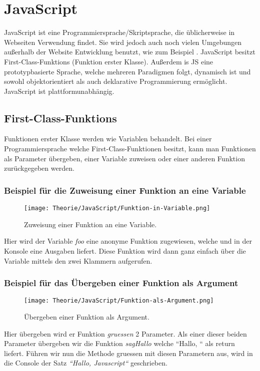 \section{JavaScript}
\label{js}

JavaScript ist eine Programmiersprache/Skriptsprache, die üblicherweise in Webseiten Verwendung findet. Sie wird jedoch auch noch vielen Umgebungen außerhalb der Website Entwicklung benutzt, 
wie zum Beispiel .
JavaScript besitzt First-Class-Funktions (Funktion erster Klasse). Außerdem is JS eine prototypbasierte Sprache, welche mehreren Paradigmen folgt, dynamisch ist und sowohl 
objektorientiert als auch deklarative Programmierung ermöglicht. JavaScript ist plattformunabhängig.~\cite{JS}

\subsection{First-Class-Funktions}
Funktionen erster Klasse werden wie Variablen behandelt. Bei einer Programmiersprache welche First-Class-Funktionen besitzt, kann man Funktionen als Parameter übergeben, einer Variable zuweisen oder
einer anderen Funktion zurückgegeben werden.
\pagebreak

\begin{center}
    \subsubsection{Beispiel für die Zuweisung einer Funktion an eine Variable}
\begin{figure}[htbp]
    \centerline{\texttt{[image: Theorie/JavaScript/Funktion-in-Variable.png]}}
    \caption{Zuweisung einer Funktion an eine Variable.~\cite{First-Class-Funktion}}
\end{figure}
\end{center}
Hier wird der Variable \textit{foo} eine anonyme Funktion zugewiesen, welche und in der Konsole eine Ausgaben liefert.
Diese Funktion wird dann ganz einfach über die Variable mittels den zwei Klammern aufgerufen.


\begin{center}
    \subsubsection{Beispiel für das Übergeben einer Funktion als Argument}
\begin{figure}[htbp]
    \centerline{\texttt{[image: Theorie/JavaScript/Funktion-als-Argument.png]}}
    \caption{Übergeben einer Funktion als Argument.~\cite{First-Class-Funktion}}
\end{figure}
\end{center}
Hier übergeben wird er Funktion \textit{gruessen} 2 Parameter. Als einer dieser beiden Parameter übergeben wir die Funktion \textit{sagHallo} welche ``Hallo, `` als return liefert.
Führen wir nun die Methode gruessen mit diesen Parametern aus, wird in die Console der Satz \textit{``Hallo, Javascript``} geschrieben.
\pagebreak

